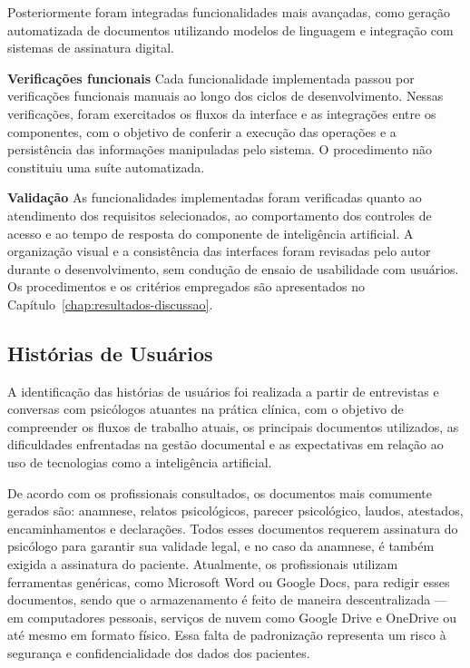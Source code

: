 Posteriormente foram integradas funcionalidades mais avançadas, como geração automatizada de documentos utilizando modelos de linguagem e integração com sistemas de assinatura digital.

\textbf{Verificações funcionais} Cada funcionalidade implementada passou por verificações funcionais manuais ao longo dos ciclos de desenvolvimento. Nessas verificações, foram exercitados os fluxos da interface e as integrações entre os componentes, com o objetivo de conferir a execução das operações e a persistência das informações manipuladas pelo sistema. O procedimento não constituiu uma suíte automatizada.

\textbf{Validação} As funcionalidades implementadas foram verificadas quanto ao atendimento dos requisitos selecionados, ao comportamento dos controles de acesso e ao tempo de resposta do componente de inteligência artificial. A organização visual e a consistência das interfaces foram revisadas pelo autor durante o desenvolvimento, sem condução de ensaio de usabilidade com usuários. Os procedimentos e os critérios empregados são apresentados no Capítulo~\ref{chap:resultados-discussao}.

\subsection{Histórias de Usuários}

A identificação das histórias de usuários foi realizada a partir de entrevistas e conversas com psicólogos atuantes na prática clínica, com o objetivo de compreender os fluxos de trabalho atuais, os principais documentos utilizados, as dificuldades enfrentadas na gestão documental e as expectativas em relação ao uso de tecnologias como a inteligência artificial.

De acordo com os profissionais consultados, os documentos mais comumente gerados são: anamnese, relatos psicológicos, parecer psicológico, laudos, atestados, encaminhamentos e declarações. Todos esses documentos requerem assinatura do psicólogo para garantir sua validade legal, e no caso da anamnese, é também exigida a assinatura do paciente. Atualmente, os profissionais utilizam ferramentas genéricas, como Microsoft Word ou Google Docs, para redigir esses documentos, sendo que o armazenamento é feito de maneira descentralizada — em computadores pessoais, serviços de nuvem como Google Drive e OneDrive ou até mesmo em formato físico. Essa falta de padronização representa um risco à segurança e confidencialidade dos dados dos pacientes.

